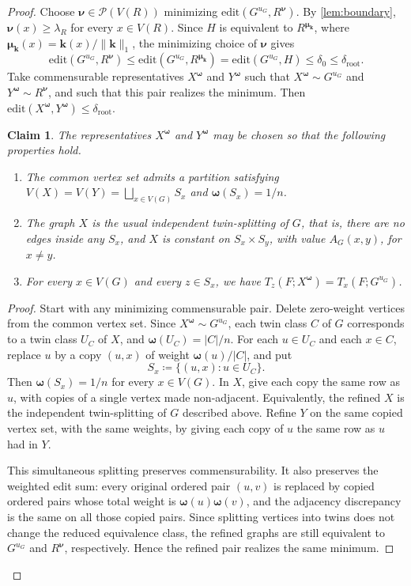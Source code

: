 \documentclass[10pt]{article}
\theoremstyle{plain}
\newtheorem{claim}[claim]{Claim}
\theoremstyle{remark}
\newcommand{\bmu}{{\boldsymbol{\mu}}}
\newcommand{\bnu}{{\boldsymbol{\nu}}}
\newcommand{\bomega}{{\boldsymbol{\omega}}}
\begin{document}
\begin{proof}
Choose $\bnu\in\mathcal P(V(R))$ minimizing $\mathrm{edit}(G^{u_G},R^\bnu)$. By \cref{lem:boundary}, $\bnu(x)\ge\lambda_R$ for every $x\in V(R)$. Since $H$ is equivalent to $R^{\bmu_{\mathbf k}}$, where $\bmu_{\mathbf k}(x)=\mathbf k(x)/\|\mathbf k\|_1$, the minimizing choice of $\bnu$ gives
\[
        \mathrm{edit}(G^{u_G},R^\bnu)\le \mathrm{edit}(G^{u_G},R^{\bmu_{\mathbf k}})
        =\mathrm{edit}(G^{u_G},H)\le\delta_0\le\delta_{\mathrm{root}}.
\]
Take commensurable representatives $X^\bomega$ and $Y^\bomega$ such that $X^\bomega\sim G^{u_G}$ and $Y^\bomega\sim R^\bnu$, and such that this pair
realizes the minimum. Then $\mathrm{edit}(X^\bomega,Y^\bomega)\le\delta_{\mathrm{root}}$.

\begin{claim}
\label{claim:refinement-representatives}
The representatives $X^\bomega$ and $Y^\bomega$ may be chosen so that the following properties hold.
\begin{enumerate}[label=\textup{(\roman*)}]
\item The common vertex set admits a partition satisfying $V(X)=V(Y)=\bigsqcup_{x\in V(G)}S_x$ and $\bomega(S_x)=1/n$.
\item The graph $X$ is the usual independent twin-splitting of $G$, that is, there are no edges inside any $S_x$, and $X$ is constant on $S_x\times S_y$, with value $A_G(x,y)$, for $x\ne y$.
\item For every $x\in V(G)$ and every $z\in S_x$, we have $T_z(F;X^\bomega)=T_x(F;G^{u_G})$.
\end{enumerate}
\end{claim}

\begin{proof}
Start with any minimizing commensurable pair. Delete zero-weight vertices from the common vertex set. Since $X^\bomega\sim G^{u_G}$, each twin class $C$ of $G$ corresponds to a twin class $U_C$ of $X$, and $\bomega(U_C)=|C|/n$.
For each $u\in U_C$ and each $x\in C$, replace $u$ by a copy $(u,x)$ of weight $\bomega(u)/|C|$, and put
\[
        S_x\coloneqq\{(u,x):u\in U_C\}.
\]
Then $\bomega(S_x)=1/n$ for every $x\in V(G)$. In $X$, give each copy the same row as $u$, with copies of a single vertex made non-adjacent. Equivalently, the refined $X$ is the independent twin-splitting of $G$ described above. Refine $Y$ on the same copied vertex set, with the same weights, by giving each copy of $u$ the same row as $u$ had in $Y$.

This simultaneous splitting preserves commensurability. It also preserves the weighted edit sum: every original ordered pair $(u,v)$ is replaced by copied ordered pairs whose total weight is $\bomega(u)\bomega(v)$, and the adjacency discrepancy is the same on all those copied pairs. Since splitting vertices into twins does not change the reduced equivalence class, the refined graphs are still equivalent to $G^{u_G}$ and $R^\bnu$, respectively. Hence the refined pair realizes the same minimum.


\end{proof}
\end{proof}
\end{document}
